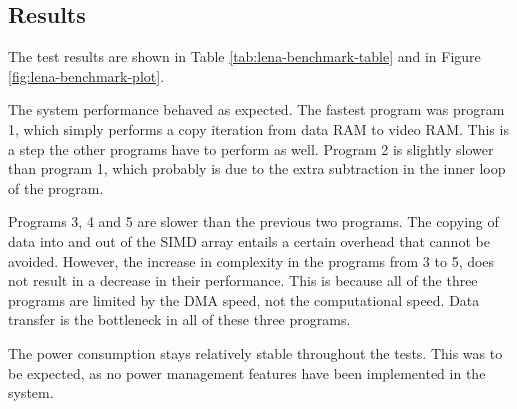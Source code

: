\subsection{Results}

The test results are shown in Table \ref{tab:lena-benchmark-table} and
in Figure \ref{fig:lena-benchmark-plot}. 




The system performance behaved as expected. The fastest program was
program 1, which simply performs a copy iteration from data RAM to video
RAM. This is a step the other programs have to perform as well. Program
2 is slightly slower than program 1, which probably is due to the extra
subtraction in the inner loop of the program.

Programs 3, 4 and 5 are slower than the previous two programs. The
copying of data into and out of the SIMD array entails a certain
overhead that cannot be avoided. However, the increase in complexity in
the programs from 3 to 5, does not result in a decrease in their
performance. This is because all of the three programs are limited by
the DMA speed, not the computational speed. Data transfer is the
bottleneck in all of these three programs.

The power consumption stays relatively stable throughout the tests. This
was to be expected, as no power management features have been
implemented in the system.
